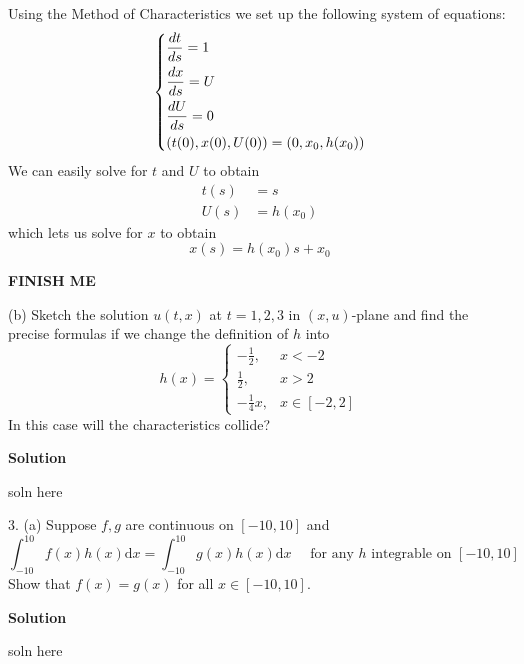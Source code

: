 \documentclass{article}
\begin{document}
Using the Method of Characteristics we set up the following system of
equations:
%
\begin{equation*}
    \begin{dcases}
        \frac{d t}{d s} = 1 \\
        \frac{d x}{d s} = U \\
        \frac{d U}{d s} = 0 \\
        \left( t(0), x(0), U(0)\right) = \left( 0, x_ 0, h(x_0) \right)
    \end{dcases}
\end{equation*}
%
We can easily solve for $t$ and $U$ to obtain
%
\begin{align*}
    t(s) &= s \\
    U(s) &= h(x_0)
\end{align*}
%
which lets us solve for $x$ to obtain
%
\begin{equation*}
    x(s) = h(x_0) s + x_0
\end{equation*}

\textbf{FINISH ME}

\vspace{5mm}

(b) Sketch the solution $u(t, x)$ at $t = 1, 2, 3$ in $(x, u)$-plane and
find the precise formulas if we change the definition of $h$ into
%
\begin{equation*}
    h(x) =
        \begin{cases}
            -\frac{1}{2}, & x < -2 \\
            \frac{1}{2}, & x > 2 \\
            -\frac{1}{4} x, & x \in [-2, 2]
        \end{cases}
\end{equation*}
%
In this case will the characteristics collide?

\textbf{Solution}

soln here

\vspace{5mm}

3. (a) Suppose $f, g$ are continuous on $[-10, 10]$ and
%
\begin{equation*}
    \int_{-10}^{10} f(x) h(x) \mathrm{d} x = \int_{-10}^{10} g(x) h(x)\mathrm{d} x
    \quad \text { for any } h \text { integrable on } [-10, 10]
\end{equation*}
%
Show that $f(x) = g(x)$ for all $x \in [-10, 10]$.

\textbf{Solution}

soln here
\end{document}
